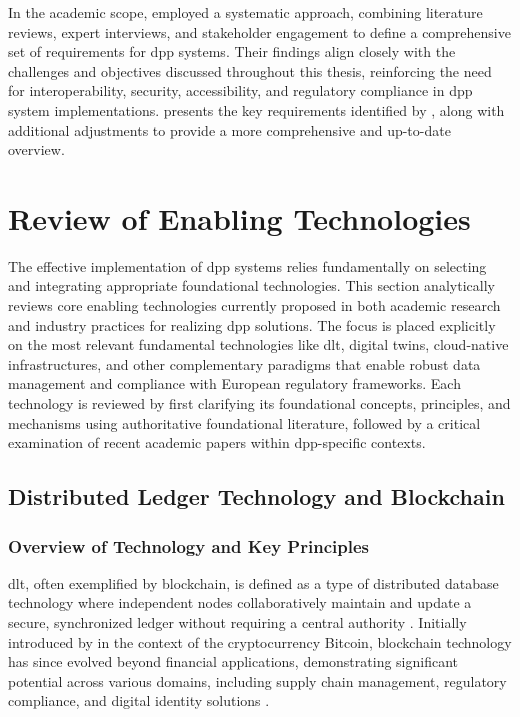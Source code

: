 In the academic scope, \textcite{Jansen.2023} employed a systematic approach, combining literature reviews, expert interviews, and stakeholder engagement to define a comprehensive set of requirements for \ac{dpp} systems. Their findings align closely with the challenges and objectives discussed throughout this thesis, reinforcing the need for interoperability, security, accessibility, and regulatory compliance in \ac{dpp} system implementations.  presents the key requirements identified by \textcite{Jansen.2023}, along with additional adjustments to provide a more comprehensive and up-to-date overview.

\section{Review of Enabling Technologies}
\label{sec:technology_review}

The effective implementation of \acrlong{dpp} systems relies fundamentally on selecting and integrating appropriate foundational technologies. This section analytically reviews core enabling technologies currently proposed in both academic research and industry practices for realizing \ac{dpp} solutions. The focus is placed explicitly on the most relevant fundamental technologies like \acrlong{dlt}, digital twins, cloud-native infrastructures, and other complementary paradigms that enable robust data management and compliance with European regulatory frameworks. Each technology is reviewed by first clarifying its foundational concepts, principles, and mechanisms using authoritative foundational literature, followed by a critical examination of recent academic papers within \ac{dpp}-specific contexts.

\subsection{Distributed Ledger Technology and Blockchain}

\subsubsection*{Overview of Technology and Key Principles}
\acrlong{dlt}, often exemplified by blockchain, is defined as a type of distributed database technology where independent nodes collaboratively maintain and update a secure, synchronized ledger without requiring a central authority \autocite{Nakamoto.2008, WorldBankGroup.2017}. Initially introduced by \textcite{Nakamoto.2008} in the context of the cryptocurrency Bitcoin, blockchain technology has since evolved beyond financial applications, demonstrating significant potential across various domains, including supply chain management, regulatory compliance, and digital identity solutions \autocite{Narayanan.2016, WorldBankGroup.2017}.


